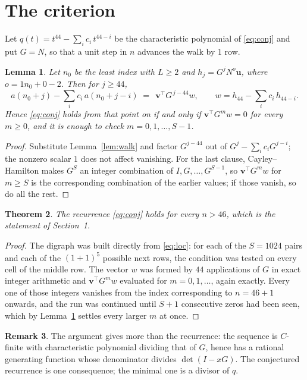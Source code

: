 \documentclass[11pt,a4paper]{article}
\theoremstyle{plain}
\newtheorem{theorem}{Theorem}
\newtheorem{lemma}[theorem]{Lemma}
\theoremstyle{definition}
\newtheorem{remark}[theorem]{Remark}
\begin{document}
\section{The criterion}

Let $q(t)=t^{44}-\sum_i c_i\,t^{44-i}$ be the characteristic polynomial of
\eqref{eq:conj} and put $G=N$, so that a unit step in $n$ advances the walk by
$1$ row.

\begin{lemma}\label{lem:crit}
Let $n_0$ be the least index with $L\ge2$ and $h_j=G^{j}N^{o}\mathbf{u}$, where
$o=1n_0+0-2$. Then for $j\ge44$,
\[
a(n_0+j)-\sum_i c_i\,a(n_0+j-i)\;=\;\,\mathbf{v}^{\!\top}G^{\,j-44}w,
\qquad w=h_{44}-\sum_i c_i\,h_{44-i} .
\]
Hence \eqref{eq:conj} holds from that point on if and only if
$\mathbf{v}^{\!\top}G^{m}w=0$ for every $m\ge0$, and it is enough to check
$m=0,1,\dots,S-1$.
\end{lemma}

\begin{proof}
Substitute Lemma~\ref{lem:walk} and factor $G^{j-44}$ out of
$G^{j}-\sum_ic_iG^{j-i}$; the nonzero scalar $1$ does not affect
vanishing. For the last clause, Cayley--Hamilton makes $G^{S}$ an integer combination of
$I,G,\dots,G^{S-1}$, so $\mathbf{v}^{\!\top}G^{m}w$ for $m\ge S$ is the corresponding
combination of the earlier values; if those vanish, so do all the rest.
\end{proof}

\begin{theorem}
The recurrence \eqref{eq:conj} holds for every $n>46$, which is the statement of
Section~1.
\end{theorem}

\begin{proof}
The digraph was built directly from \eqref{eq:loc}: for each of the $S=1024$ pairs and each
of the $(1+1)^{5}$ possible next rows, the condition was tested on every cell of
the middle row. The vector $w$ was formed by $44$ applications of $G$ in exact integer
arithmetic and $\mathbf{v}^{\!\top}G^{m}w$ evaluated for $m=0,1,\dots$, again exactly.
Every one of those integers vanishes from the index corresponding to $n=46+1$ onwards,
and the run was continued until $S+1$ consecutive zeros had been seen, which by
Lemma~\ref{lem:crit} settles every larger $m$ at once.
\end{proof}

\begin{remark}
The argument gives more than the recurrence: the sequence is $C$-finite with characteristic
polynomial dividing that of $G$, hence has a rational generating function whose denominator
divides $\det(I-xG)$. The conjectured recurrence is one consequence; the minimal one is a
divisor of $q$.
\end{remark}
\end{document}
